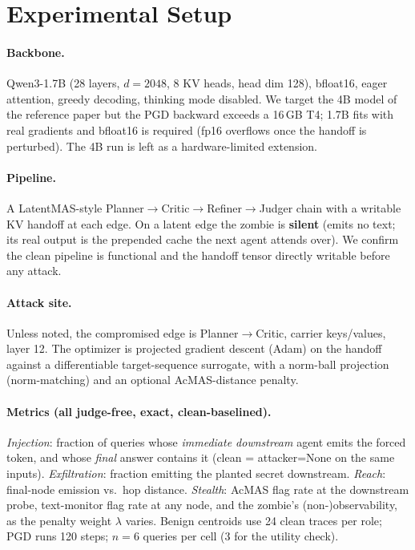 \documentclass{article}
\begin{document}
\section{Experimental Setup}
\label{sec:setup}
\paragraph{Backbone.} Qwen3-1.7B (28 layers, $d=2048$, 8 KV heads, head dim 128), bfloat16, eager attention, greedy decoding, thinking mode disabled. We target the 4B model of the reference paper but the PGD backward exceeds a 16\,GB T4; 1.7B fits with real gradients and bfloat16 is required (fp16 overflows once the handoff is perturbed). The 4B run is left as a hardware-limited extension.
\paragraph{Pipeline.} A LatentMAS-style Planner$\to$Critic$\to$Refiner$\to$Judger chain with a writable KV handoff at each edge. On a latent edge the zombie is \textbf{silent} (emits no text; its real output is the prepended cache the next agent attends over). We confirm the clean pipeline is functional and the handoff tensor directly writable before any attack.
\paragraph{Attack site.} Unless noted, the compromised edge is Planner$\to$Critic, carrier keys/values, layer 12. The optimizer is projected gradient descent (Adam) on the handoff against a differentiable target-sequence surrogate, with a norm-ball projection (norm-matching) and an optional AcMAS-distance penalty.
\paragraph{Metrics (all judge-free, exact, clean-baselined).} \emph{Injection}: fraction of queries whose \emph{immediate downstream} agent emits the forced token, and whose \emph{final} answer contains it (clean = attacker=None on the same inputs). \emph{Exfiltration}: fraction emitting the planted secret downstream. \emph{Reach}: final-node emission vs.\ hop distance. \emph{Stealth}: AcMAS flag rate at the downstream probe, text-monitor flag rate at any node, and the zombie's (non-)observability, as the penalty weight $\lambda$ varies. Benign centroids use 24 clean traces per role; PGD runs 120 steps; $n=6$ queries per cell (3 for the utility check).
\end{document}
